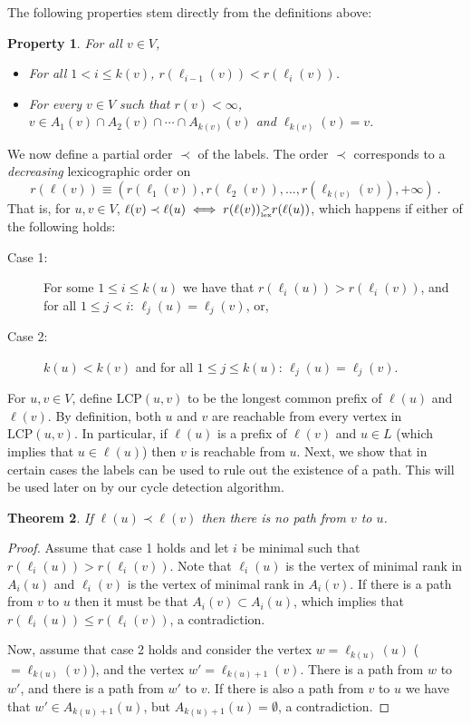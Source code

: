 \documentclass[11pt]{article}
\theoremstyle{plain}
\newtheorem{thm}{Theorem}[section]
\newtheorem{prop}[thm]{Property}
\theoremstyle{definition}
\theoremstyle{remark}
\numberwithin{equation}{section}
\DeclareMathOperator{\glex}{\prec}
\begin{document}
The following
properties stem directly from the definitions above:
\begin{prop}
For all $v\in V$,
\begin{itemize}
\item For all $1 < i \leq k(v)$, $r(\ell_{i-1}(v)) < r(\ell_i(v))$.
\item For every $v\in V$ such that $r(v)<\infty$,
 $v\in A_1(v)\cap A_2(v) \cap \cdots \cap A_{k(v)}(v)$ and $\ell_{k(v)}(v)=v$.
\end{itemize}
\end{prop}

We now define a partial order $\prec$ of the labels.  The order
$\prec$  corresponds to a
{\em decreasing} lexicographic order on $$r(\ell(v)) \equiv (r(\ell_1(v)),r(\ell_2(v)),\ldots,
r(\ell_{k(v)}(v)), +\infty)\ .$$
That is, for $u,v\in V$, $\ell(v) \prec \ell(u) \iff r(\ell(v)) \raisebox{-3pt}{$\overset{>}{\mbox{\rm\tiny lex}}$}  r(\ell(u))$,
which happens if either of the following holds:
\begin{description}
\item[Case 1:] For some $1\leq i\leq k(u)$ we have that $r(\ell_i(u))>r(\ell_i(v))$, and for all $1 \leq j < i$: $\ell_j(u) = \ell_j(v)$, or,
\item[Case 2:] $k(u)<k(v)$ and for all $1 \leq j \leq k(u)$:
$\ell_j(u)=\ell_j(v)$.
\end{description}

For $u,v \in V$, define $\mathrm{LCP}(u,v)$ to  be the longest
common prefix of $\ell(u)$ and $\ell(v)$. By definition, both $u$
and $v$ are reachable from every vertex in $\mathrm{LCP}(u,v)$. In
particular, if $\ell(u)$ is a prefix of $\ell(v)$ and $u\in L$
(which implies that $u\in \ell(u)$) then $v$ is reachable from $u$.
Next, we show that in certain cases the labels can be used to rule out the existence of a path. This will be used later on by our cycle detection algorithm.

\begin{thm}\label{T-no-path}
If $\ell(u) \glex \ell(v)$ then there is no path from $v$ to $u$.
\end{thm}
\begin{proof}
Assume that case 1 holds and let $i$ be minimal such that
$r(\ell_i(u))>r(\ell_i(v))$. Note that $\ell_i(u)$ is the vertex of
minimal rank in $A_i(u)$ and $\ell_i(v)$ is the vertex of minimal
rank in $A_i(v)$. If there is a path from $v$ to $u$ then it must be
that $A_i(v)\subset A_i(u)$, which implies that $r(\ell_i(u)) \leq
r(\ell_i(v))$, a contradiction.

Now, assume that case 2 holds and consider the vertex $w=\ell_{k(u)}(u)$ ($=\ell_{k(u)}(v)$), and the vertex $w'=\ell_{k(u)+1}(v)$. There is a path from $w$ to $w'$,  and there is a path
from $w'$ to $v$. If there is also a path from $v$ to $u$ we have that $w'\in A_{k(u)+1}(u)$, but $A_{k(u)+1}(u) = \emptyset$, a contradiction.
\end{proof}
\end{document}
